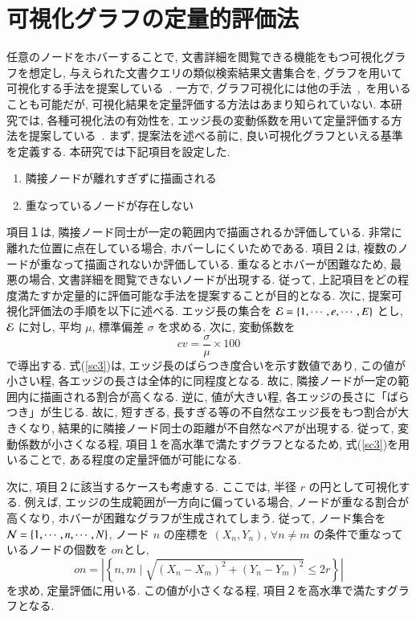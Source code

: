 \documentclass[a4j,fleqn,10pt]{jarticle}
\begin{document}
\section{可視化グラフの定量的評価法}
任意のノードをホバーすることで, 文書詳細を閲覧できる機能をもつ可視化グラフを想定し, 
与えられた文書クエリの類似検索結果文書集合を, グラフを用いて可視化する手法を提案している~\cite{ozaki1}.
一方で, グラフ可視化には他の手法~\cite{saito},~\cite{kamada89}を用いることも可能だが, 可視化結果を定量評価する方法はあまり知られていない.
本研究では, 各種可視化法の有効性を, エッジ長の変動係数を用いて定量評価する方法を提案している~\cite{ozaki2}.
まず, 提案法を述べる前に, 良い可視化グラフといえる基準を定義する.
本研究では下記項目を設定した.
\begin{enumerate}
    \item 隣接ノードが離れすぎずに描画される
    \item 重なっているノードが存在しない
\end{enumerate}
項目１は, 隣接ノード同士が一定の範囲内で描画されるか評価している.
非常に離れた位置に点在している場合, ホバーしにくいためである.
項目２は, 複数のノードが重なって描画されないか評価している.
重なるとホバーが困難なため, 最悪の場合, 文書詳細を閲覧できないノードが出現する.
従って, 上記項目をどの程度満たすか定量的に評価可能な手法を提案することが目的となる.
次に, 提案可視化評価法の手順を以下に述べる.
エッジ長の集合を ${\cal E} = \{1, \cdots, e, \cdots, E \}$ とし,
${\cal E}$ に対し, 平均 $\mu$, 標準偏差 $\sigma$ を求める.
次に, 変動係数を
\begin{equation}
  {cv} = \frac{\sigma}{\mu} \times 100
  \label{sc3}
\end{equation}
で導出する.
式(\ref{sc3})は, エッジ長のばらつき度合いを示す数値であり,
この値が小さい程, 各エッジの長さは全体的に同程度となる.
故に, 隣接ノードが一定の範囲内に描画される割合が高くなる.
逆に, 値が大きい程, 各エッジの長さに「ばらつき」が生じる.
故に, 短すぎる, 長すぎる等の不自然なエッジ長をもつ割合が大きくなり, 
結果的に隣接ノード同士の距離が不自然なペアが出現する.
従って, 変動係数が小さくなる程, 項目１を高水準で満たすグラフとなるため,
式(\ref{sc3})を用いることで, ある程度の定量評価が可能になる.

次に, 項目２に該当するケースも考慮する.
ここでは, 半径 $r$ の円として可視化する.
例えば, エッジの生成範囲が一方向に偏っている場合, 
ノードが重なる割合が高くなり, ホバーが困難なグラフが生成されてしまう.
従って, ノード集合を ${\cal N} = \{1, \cdots, n, \cdots, N \}$, 
ノード $n$ の座標を $(X_n, Y_n)$, $\forall n \neq m$ の条件で重なっているノードの個数を $on$とし,
\begin{equation}
  {on} = |\left\{ n, m \mid \sqrt{(X_n - X_m)^2 + (Y_n - Y_m)^2} \leq 2r \right\}|
  \label{sc4}
\end{equation}
を求め, 定量評価に用いる.
この値が小さくなる程, 項目２を高水準で満たすグラフとなる.
\end{document}
